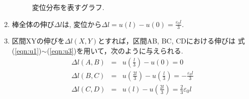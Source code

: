 \documentclass[10pt,a4j]{jarticle}
\begin{document}
\begin{enumerate}
\begin{figure}[h]
\begin{center}
	\end{center}
	\caption{変位分布を表すグラフ.} 
	\label{fig:fig1}
\end{figure}
\item
	棒全体の伸び$\Delta l$は, 変位から$\Delta l=u(l)-u(0)=\frac{\varepsilon_0l}{3}$.
\item
	区間XYの伸びを$\Delta l(X,Y)$とすれば，区間AB, BC, CDにおける伸びは
	式(\ref{eqn:u1})$\sim$(\ref{eqn:u3})を用いて，次のように与えられる.
	\begin{eqnarray*}
		\Delta l(A,B) 
		&=& 
		u\left( \frac{l}{3}\right)-u(0)=0
		\\
		\Delta l(B,C)
		&=&
		u\left( \frac{2l}{3}\right)-u\left(\frac{l}{3}\right)
		=-\frac{\varepsilon_0l}{3}
		\\	
		\Delta l(C,D)
		&=&u(l)-u\left( \frac{2l}{3}\right)=\frac{2}{3}\varepsilon_0l
	\end{eqnarray*}	
\end{enumerate}
\end{document}
